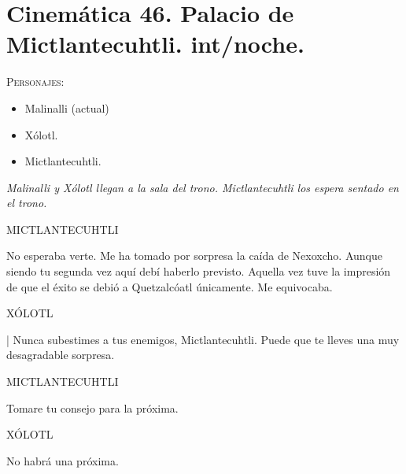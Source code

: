 \documentclass[11pt,letterpaper]{article}
\begin{document}
\section{Cinemática 46. Palacio de Mictlantecuhtli. int/noche.}
 \textsc{Personajes}:
 \begin{itemize}
 \item Malinalli (actual)
 \item Xólotl.
 \item Mictlantecuhtli.
 \end{itemize}
\textit{Malinalli y Xólotl llegan a la sala del trono. Mictlantecuhtli los espera sentado en el trono. }
\begin{center}
MICTLANTECUHTLI
\\
\par
No esperaba verte. Me ha tomado por sorpresa la caída de Nexoxcho. Aunque siendo tu segunda vez aquí debí haberlo previsto. Aquella vez tuve la impresión de que el éxito se debió a Quetzalcóatl únicamente. Me equivocaba.
\\
\par
XÓLOTL
\\
\par|
Nunca subestimes a tus enemigos,  Mictlantecuhtli. Puede que te lleves una muy desagradable sorpresa.
\\
\par
MICTLANTECUHTLI
\\
\par
Tomare tu consejo para la próxima.
\\
\par
XÓLOTL
\\
\par
No habrá una próxima.  
\end{center}
\end{document}
